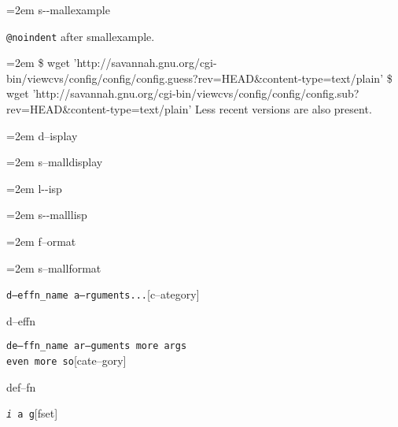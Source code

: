 \documentclass{book}
\begin{document}
\begin{titlepage}
\par\begingroup\obeylines\obeyspaces\frenchspacing\leftskip=2em\relax\parskip=0pt\relax\ttfamily\footnotesize{}%
s{-}{-}mallexample
\endgroup{}%

\texttt{@noindent} after smallexample.
\par\begingroup\obeylines\obeyspaces\frenchspacing\leftskip=2em\relax\parskip=0pt\relax\ttfamily\footnotesize{}%
\$ wget 'http://savannah.gnu.org/cgi-bin/viewcvs/config/config/config.guess?rev=HEAD\&content-type=text/plain'
\$ wget 'http://savannah.gnu.org/cgi-bin/viewcvs/config/config/config.sub?rev=HEAD\&content-type=text/plain'
\endgroup{}%
\noindent{}Less recent versions are also present.

\par\begingroup\obeylines\obeyspaces\frenchspacing\leftskip=2em\relax\parskip=0pt\relax{}%
d--isplay
\endgroup{}%

\par\begingroup\obeylines\obeyspaces\frenchspacing\leftskip=2em\relax\parskip=0pt\relax\footnotesize{}%
s--malldisplay
\endgroup{}%

\par\begingroup\obeylines\obeyspaces\frenchspacing\leftskip=2em\relax\parskip=0pt\relax\ttfamily{}%
l{-}{-}isp
\endgroup{}%

\par\begingroup\obeylines\obeyspaces\frenchspacing\leftskip=2em\relax\parskip=0pt\relax\ttfamily\footnotesize{}%
s{-}{-}malllisp
\endgroup{}%

\par\begingroup\obeylines\obeyspaces\frenchspacing\leftskip=2em\relax\parskip=0pt\relax{}%
f--ormat
\endgroup{}%

\par\begingroup\obeylines\obeyspaces\frenchspacing\leftskip=2em\relax\parskip=0pt\relax\footnotesize{}%
s--mallformat
\endgroup{}%

\noindent\texttt\bgroup{}d--effn\_name a--rguments...\egroup{}\hfill[c--ategory]



%
d--effn

\noindent\texttt\bgroup{}de--ffn\_name ar--guments    more args \leavevmode{}\\ even more so\egroup{}\hfill[cate--gory]



%
def--fn

\noindent\texttt\bgroup{}\emph{i} a g\egroup{}\hfill[fset]




\end{titlepage}
\end{document}

